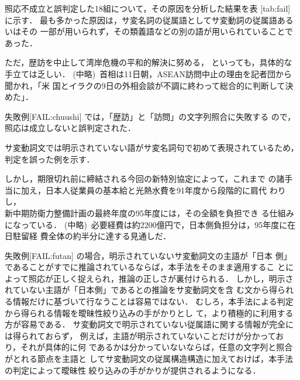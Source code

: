 照応不成立と誤判定した18組について，その原因を分析した結果を表
[tab:fail] に示す．
最も多かった原因は，サ変名詞の従属語としてサ変動詞の従属語あるいはその
一部が用いられず，その類義語などの別の語が用いられていることであった．
\begin{FAIL}
\fail  ただ，歴訪を中止して湾岸危機の平和的解決に努める，
といっても，具体的な手立ては乏しい．
(中略)\ 
首相は11日朝，ASEAN訪問中止の理由を記者団から聞かれ，「米
国とイラクの9日の外相会談が不調に終わって総合的に判断して決めた」．

\end{FAIL}
失敗例[FAIL:chuushi] では，「歴訪」と「訪問」の文字列照合に失敗する
ので，照応は成立しないと誤判定された．

サ変動詞文では明示されていない語がサ変名詞句で初めて表現されているため，
判定を誤った例を示す．
\begin{FAIL}
\fail しかし，期限切れ前に締結される今回の新特別協定によって，これまで
の諸手当に加え，日本人従業員の基本給と光熱水費を91年度から段階的に肩代
わりし，\\
新中期防衛力整備計画の最終年度の95年度には，その全額を負担でき
る仕組みになっている．
(中略)\ 
必要経費は約2200億円で，日本側負担分は，95年度に在\\日駐留経
費全体の約半分に達する見通しだ．
\end{FAIL}
失敗例[FAIL:futan] の場合，明示されていないサ変動詞文の主語が「日本
側」であることがすでに推論されているならば，本手法をそのまま適用するこ
とによって照応が正しく捉えられ，推論の正しさが裏付けられる．
しかし，明示されていない主語が「日本側」であるとの推論をサ変動詞文を含
む文から得られる情報だけに基づいて行なうことは容易ではない．
むしろ，本手法による判定から得られる情報を曖昧性絞り込みの手がかりとし
て，より積極的に利用する方が容易である．
サ変動詞文で明示されていない従属語に関する情報が完全には得られておらず，
例えば，主語が明示されていないことだけが分かっており，それが具体的に何
であるかは分かっていないならば，任意の文字列と照合がとれる節点を主語と
してサ変動詞文の従属構造構造に加えておけば，本手法の判定によって曖昧性
絞り込みの手がかりが提供されるようになる．

